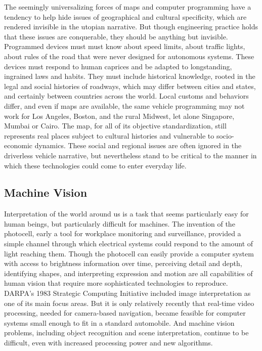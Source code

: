 The seemingly universalizing forces of maps and computer programming
have a tendency to help hide issues of geographical and cultural
specificity, which are rendered invisible in the utopian narrative.
But though engineering practice holds that these issues are
conquerable, they should be anything but invisible. Programmed devices
must must know about speed limits, about traffic
lights, about rules of the road that were never designed for
autonomous systems. These devices must respond to human caprices and
be adapted to longstanding, ingrained laws and habits. They must
include historical knowledge, rooted in the legal and social histories
of roadways, which may differ between cities and states, and certainly
between countries across the world. Local customs and behaviors differ, and even if maps are
available, the same vehicle programming may not work for Los Angeles,
Boston, and the rural Midwest, let alone Singapore, Mumbai or Cairo.
The map, for all of its objective standardization, still represents
real places subject to cultural histories and vulnerable to
socio-economic dynamics. These social and regional issues are often
ignored in the driverless vehicle narrative, but nevertheless stand to
be critical to the manner in which these technologies could come to
enter everyday life.



\subsection{Machine Vision}
Interpretation of the world around us is a task that seems
particularly easy for human beings, but particularly difficult for
machines. The invention of the photocell, early a tool for workplace
monitoring and surveillance, provided a simple channel through which
electrical systems could respond to the amount of light reaching
them.\cite{???} Though the photocell can easily provide a computer system
with access to brightness information over time, perceiving detail and
depth, identifying shapes, and interpreting expression and motion are
all capabilities of human vision that require more sophisticated
technologies to reproduce. DARPA's 1983 Strategic Computing Initiative
included image interpretation as one of its main
focus areas.\cite{???} But it is only relatively recently that real-time video
processing, needed for camera-based navigation, became feasible for computer
systems small enough to fit in a standard automobile.\cite{???} And machine
vision problems, including object recognition and scene
interpretation, continue to be difficult, even with increased
processing power and new algorithms. 

